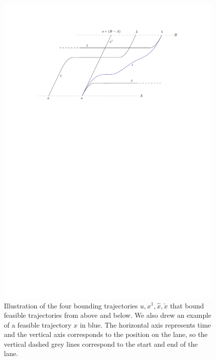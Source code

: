 \documentclass[a4paper]{article}
\theoremstyle{definition}
\theoremstyle{plain}
\begin{document}
\begin{figure}
  \centering
  \includegraphics[scale=0.9]{figures/motion/necessary-conditions}
  \caption{Illustration of the four bounding trajectories
    $u, x^{1}, \hat{x}, \check{x}$ that bound feasible trajectories from
    above and below. We also drew an example of a feasible trajectory $x$ in
    blue. The horizontal axis represents time and the vertical axis corresponds
    to the position on the lane, so the vertical dashed grey lines correspond to
    the start and end of the lane.}%
  \label{fig:necessary-conditions}
\end{figure}
\end{document}
